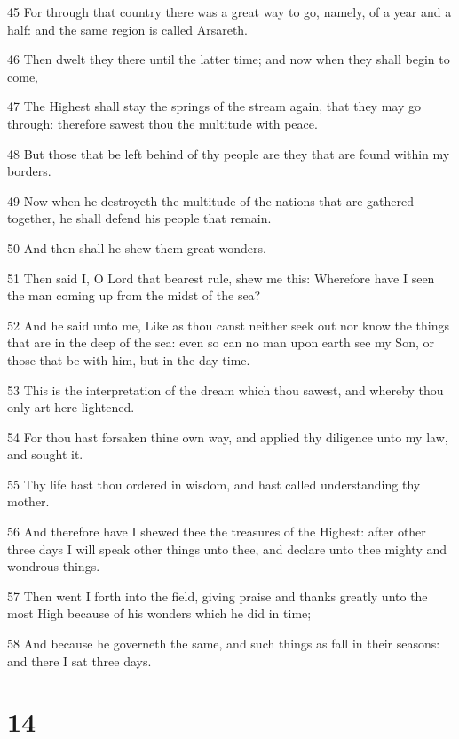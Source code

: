 \par 45 For through that country there was a great way to go, namely, of a year and a half: and the same region is called Arsareth.
\par 46 Then dwelt they there until the latter time; and now when they shall begin to come,
\par 47 The Highest shall stay the springs of the stream again, that they may go through: therefore sawest thou the multitude with peace.
\par 48 But those that be left behind of thy people are they that are found within my borders.
\par 49 Now when he destroyeth the multitude of the nations that are gathered together, he shall defend his people that remain.
\par 50 And then shall he shew them great wonders.
\par 51 Then said I, O Lord that bearest rule, shew me this: Wherefore have I seen the man coming up from the midst of the sea?
\par 52 And he said unto me, Like as thou canst neither seek out nor know the things that are in the deep of the sea: even so can no man upon earth see my Son, or those that be with him, but in the day time.
\par 53 This is the interpretation of the dream which thou sawest, and whereby thou only art here lightened.
\par 54 For thou hast forsaken thine own way, and applied thy diligence unto my law, and sought it.
\par 55 Thy life hast thou ordered in wisdom, and hast called understanding thy mother.
\par 56 And therefore have I shewed thee the treasures of the Highest: after other three days I will speak other things unto thee, and declare unto thee mighty and wondrous things.
\par 57 Then went I forth into the field, giving praise and thanks greatly unto the most High because of his wonders which he did in time;
\par 58 And because he governeth the same, and such things as fall in their seasons: and there I sat three days.

\chapter{14}

